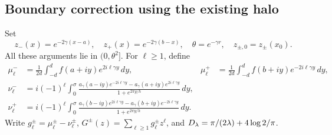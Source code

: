 \subsection{Boundary correction using the existing halo}
\label{sec:boundary}
Set
\begin{equation}
 z_-(x)=e^{-2\gamma(x-a)},\quad z_+(x)=e^{-2\gamma(b-x)},
 \quad\theta=e^{-\gamma r},\quad z_{\pm,0}=z_\pm(x_0).
 \label{eq:zpm}
\end{equation}
All these arguments lie in $(0,\theta^2]$. For $\ell\ge1$, define
\begin{align}
 \mu_\ell^-&=\frac1{2d}\int_{-d}^d f(a+iy)e^{2i\ell\gamma y}\,dy,
 &\mu_\ell^+&=\frac1{2d}\int_{-d}^d f(b+iy)e^{-2i\ell\gamma y}\,dy,
 \label{eq:mu}\\
 \nu_\ell^-&=i(-1)^\ell\int_0^\sigma
 \frac{a_\gamma(a-iy)e^{-2i\ell\gamma y}-a_\gamma(a+iy)e^{2i\ell\gamma y}}
 {1+e^{2\pi y/h}}\,dy, \label{eq:numinus}\\
 \nu_\ell^+&=i(-1)^\ell\int_0^\sigma
 \frac{a_\gamma(b-iy)e^{2i\ell\gamma y}-a_\gamma(b+iy)e^{-2i\ell\gamma y}}
 {1+e^{2\pi y/h}}\,dy. \label{eq:nuplus}
\end{align}
Write $g_\ell^\pm=\mu_\ell^\pm-\nu_\ell^\pm$,
$G^\pm(z)=\sum_{\ell\ge1}g_\ell^\pm z^\ell$, and
$D_\lambda=\pi/(2\lambda)+4\log2/\pi$.

